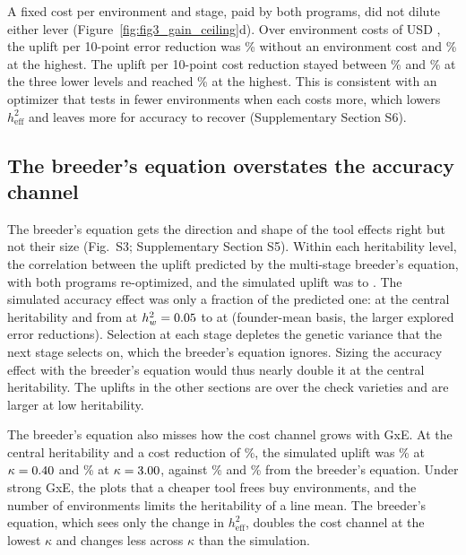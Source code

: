 A fixed cost per environment and stage, paid by both programs, did not dilute either lever (Figure~\ref{fig:fig3_gain_ceiling}d). Over environment costs of USD \NumCfgEnvCostLevels, the uplift per 10-point error reduction was \NumEnvCostZeroErrSlope\% without an environment cost and \NumEnvCostFiveKErrSlope\% at the highest. The uplift per 10-point cost reduction stayed between \NumEnvCostOneKCostSlope\% and \NumEnvCostZeroCostSlope\% at the three lower levels and reached \NumEnvCostFiveKCostSlope\% at the highest. This is consistent with an optimizer that tests in fewer environments when each costs more, which lowers $h^2_{\mathrm{eff}}$ and leaves more for accuracy to recover (Supplementary Section S6).

\subsection{The breeder's equation overstates the accuracy channel}\label{sec:res_be}

The breeder's equation gets the direction and shape of the tool effects right but not their size (Fig.~S3; Supplementary Section S5). Within each heritability level, the correlation between the uplift predicted by the multi-stage breeder's equation, with both programs re-optimized, and the simulated uplift was \NumBEcorMin to \NumBEcorMax. The simulated accuracy effect was only a fraction of the predicted one: \NumBEratioHtwoTen at the central heritability and from \NumBEratioHtwoFive at $h^2_w = 0.05$ to \NumBEratioHtwoThirty at \NumCfgRobHtwoHigh (founder-mean basis, the larger explored error reductions). Selection at each stage depletes the genetic variance that the next stage selects on, which the breeder's equation ignores. Sizing the accuracy effect with the breeder's equation would thus nearly double it at the central heritability. The uplifts in the other sections are over the check varieties and are larger at low heritability.

The breeder's equation also misses how the cost channel grows with GxE. At the central heritability and a cost reduction of \NumBEcostRedMax\%, the simulated uplift was \NumBEcostKappaLoSim\% at $\kappa = 0.40$ and \NumBEcostKappaHiSim\% at $\kappa = 3.00$, against \NumBEcostKappaLoBE\% and \NumBEcostKappaHiBE\% from the breeder's equation. Under strong GxE, the plots that a cheaper tool frees buy environments, and the number of environments limits the heritability of a line mean. The breeder's equation, which sees only the change in $h^2_{\mathrm{eff}}$, doubles the cost channel at the lowest $\kappa$ and changes less across $\kappa$ than the simulation.

